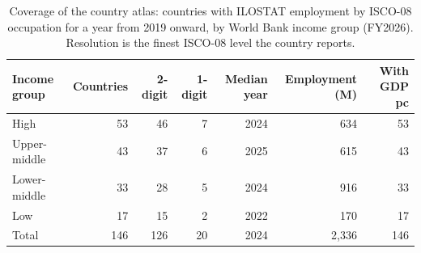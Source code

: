 \begin{table}[t]
\centering\small
\caption{Coverage of the country atlas: countries with ILOSTAT employment by ISCO-08 occupation for a year from 2019 onward, by World Bank income group (FY2026). Resolution is the finest ISCO-08 level the country reports.}
\label{tab:cobertura}
\begin{tabular}{lrrrrrr}
\toprule
Income group & Countries & 2-digit & 1-digit & Median year & Employment (M) & With GDP pc \\
\midrule
High & 53 & 46 & 7 & 2024 & 634 & 53 \\
Upper-middle & 43 & 37 & 6 & 2025 & 615 & 43 \\
Lower-middle & 33 & 28 & 5 & 2024 & 916 & 33 \\
Low & 17 & 15 & 2 & 2022 & 170 & 17 \\
\midrule
Total & 146 & 126 & 20 & 2024 & 2,336 & 146 \\
\bottomrule
\end{tabular}
\end{table}
